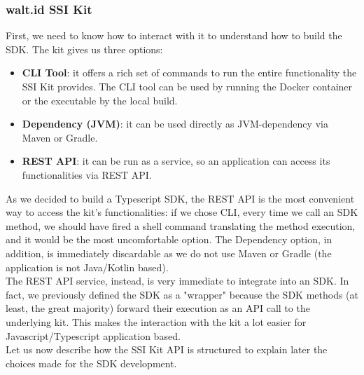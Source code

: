 \subsubsection{walt.id SSI Kit}
First, we need to know how to interact with it to understand how to build the SDK.
The kit gives us three options:
\begin{itemize}
    \item \textbf{CLI Tool}: it offers a rich set of commands to run the entire functionality 
    the SSI Kit provides. The CLI tool can be used by running the Docker container or
    the executable by the local build.
    \item \textbf{Dependency (JVM)}: it can be used directly as JVM-dependency via Maven or 
    Gradle.
    \item \textbf{REST API}: it can be run as a service, so an application can access its 
    functionalities via REST API.
\end{itemize}
As we decided to build a Typescript SDK, the REST API is the most convenient way 
to access the kit's functionalities: if we chose CLI, every time we call an SDK 
method,  we should have fired a shell command translating the method execution, and 
it would be the most uncomfortable option. The Dependency option, in addition, is 
immediately discardable as we do not use Maven or Gradle (the application is not 
Java/Kotlin based).\\
The REST API service, instead, is very immediate to integrate into an SDK.
In fact, we previously defined the SDK as a "wrapper" because the SDK methods (at 
least, the great majority) forward their execution as an API call to the underlying 
kit. This makes the interaction with the kit a lot easier for Javascript/Typescript 
application based.
\vspace*{0.3cm}\\
Let us now describe how the SSI Kit API is structured to explain later the choices 
made for the SDK development.
